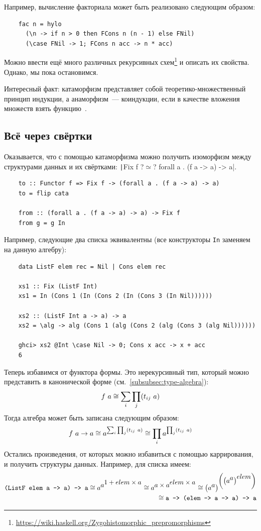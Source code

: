 Например, вычисление факториала может быть реализовано следующим образом:
\begin{verbatim}
    fac n = hylo
      (\n -> if n > 0 then FCons n (n - 1) else FNil)
      (\case FNil -> 1; FCons n acc -> n * acc)
\end{verbatim}

Можно ввести ещё много различных рекурсивных схем\footnote{\url{https://wiki.haskell.org/Zygohistomorphic_prepromorphisms}} и описать их свойства.
Однако, мы пока остановимся.

Интересный факт: катаморфизм представляет собой теоретико-множественный принцип индукции, а анаморфизм~--- коиндукции, если в качестве вложения множеств взять функцию~\cite[глава 21]{pierce2002types}.

\subsection{Всё через свёртки} \label{subsec:all-folds}

Оказывается, что с помощью катаморфизма можно получить изоморфизм между структурами данных и их свёртками:
\texttt|Fix f ?$\simeq$? forall a . (f a -> a) -> a|.
\begin{verbatim}
    to :: Functor f => Fix f -> (forall a . (f a -> a) -> a)
    to = flip cata

    from :: (forall a . (f a -> a) -> a) -> Fix f
    from g = g In
\end{verbatim}

Например, следующие два списка эквивалентны (все конструкторы \texttt{In} заменяем на данную алгебру):
\begin{verbatim}
    data ListF elem rec = Nil | Cons elem rec

    xs1 :: Fix (ListF Int)
    xs1 = In (Cons 1 (In (Cons 2 (In (Cons 3 (In Nil))))))

    xs2 :: (ListF Int a -> a) -> a
    xs2 = \alg -> alg (Cons 1 (alg (Cons 2 (alg (Cons 3 (alg Nil))))))

    ghci> xs2 @Int \case Nil -> 0; Cons x acc -> x + acc
    6
\end{verbatim}

Теперь избавимся от функтора формы.
Это нерекурсивный тип, который можно представить в канонической форме (см.~\ref{subsubsec:type-algebra}):
\[
    f~ a \cong \sum_{i}\prod_{j} (t_{ij}~ a)
\]
Тогда алгебра может быть записана следующим образом:
\[
    f~ a\to a\cong a^{\sum_{i}\prod_{j} (t_{ij}~ a)} \cong \prod_{i}a^{\prod_{j} (t_{ij}~ a)}
\]
Остались произведения, от которых можно избавиться с помощью каррирования, и получить  структуры данных.
Например, для списка имеем:
\begin{align*}
    \text{\texttt{(ListF elem a -> a) -> a}}
    \cong a^{\displaystyle a^{\displaystyle 1 + elem\times a}}
    \cong a^{\displaystyle a\times a^{\displaystyle elem\times a}}
    \cong \left( a^{\displaystyle a} \right)^{\displaystyle \left(\left( a^{\displaystyle a}\right)^{\displaystyle elem}\right)} \\
    \cong \text{\texttt{a -> (elem -> a -> a) -> a}}
\end{align*}

